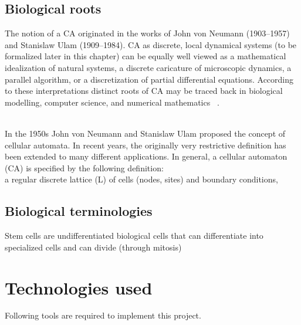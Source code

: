 \subsection{Biological roots}

The notion of a CA originated in the works of John von Neumann (1903–1957) and Stanislaw Ulam (1909–1984). 
CA as discrete, local dynamical systems (to be formalized later in this chapter) can be equally well viewed as a mathematical idealization of natural systems, 
a discrete caricature of microscopic dynamics, a parallel algorithm, or a discretization of partial differential equations. 
According to these interpretations distinct roots of CA may be traced back in biological modelling, computer science, 
and numerical mathematics ~\cite{CellularAutomatonModelingOfBiologicalPatternFormation}.

~\\In the 1950s John von Neumann and Stanislaw Ulam proposed the concept of cellular automata. 
In recent years, the originally very restrictive definition has been extended to many different applications. 
In general, a cellular automaton (CA) is specified by the following definition:
~\\a regular discrete lattice (L) of cells (nodes, sites) and boundary conditions,


\subsection{Biological terminologies}
Stem cells are undifferentiated biological cells that can differentiate into specialized cells and can divide (through mitosis) 


\section{Technologies used}
Following tools are required to implement this project.

